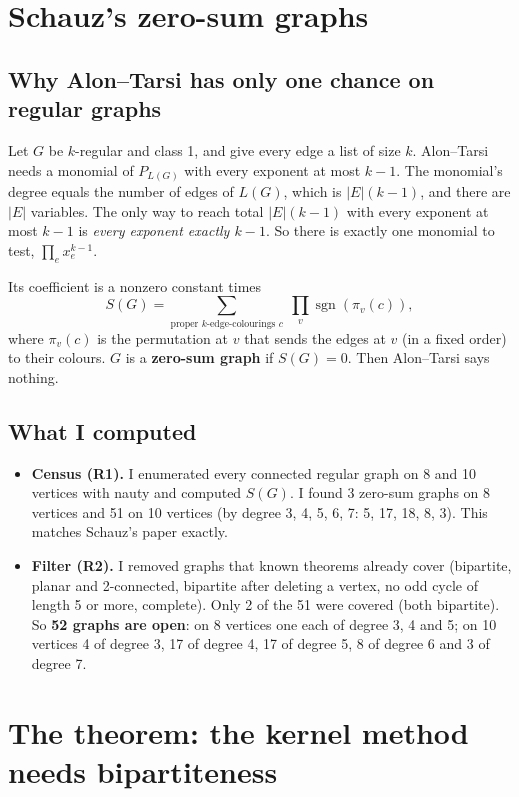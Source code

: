 \documentclass[11pt]{article}
\theoremstyle{plain}
\theoremstyle{definition}
\begin{document}
\section{Schauz's zero-sum graphs}

\subsection{Why Alon--Tarsi has only one chance on regular graphs}

Let $G$ be $k$-regular and class 1, and give every edge a list of size $k$. Alon--Tarsi needs a
monomial of $P_{L(G)}$ with every exponent at most $k-1$. The monomial's degree equals the
number of edges of $L(G)$, which is $|E|(k-1)$, and there are $|E|$ variables. The only way to
reach total $|E|(k-1)$ with every exponent at most $k-1$ is \emph{every exponent exactly $k-1$}.
So there is exactly one monomial to test, $\prod_e x_e^{k-1}$.

Its coefficient is a nonzero constant times
\[
  S(G) = \sum_{\text{proper } k\text{-edge-colourings } c} \; \prod_{v} \operatorname{sgn}(\pi_v(c)),
\]
where $\pi_v(c)$ is the permutation at $v$ that sends the edges at $v$ (in a fixed order) to
their colours. $G$ is a \textbf{zero-sum graph} if $S(G) = 0$. Then Alon--Tarsi says nothing.

\subsection{What I computed}

\begin{itemize}[leftmargin=*]
  \item \textbf{Census (R1).} I enumerated every connected regular graph on 8 and 10 vertices
        with nauty and computed $S(G)$. I found 3 zero-sum graphs on 8 vertices and 51 on 10
        vertices (by degree 3, 4, 5, 6, 7: 5, 17, 18, 8, 3). This matches Schauz's paper
        exactly.
  \item \textbf{Filter (R2).} I removed graphs that known theorems already cover (bipartite,
        planar and 2-connected, bipartite after deleting a vertex, no odd cycle of length 5 or
        more, complete). Only 2 of the 51 were covered (both bipartite). So \textbf{52 graphs are
        open}: on 8 vertices one each of degree 3, 4 and 5; on 10 vertices 4 of degree 3, 17 of
        degree 4, 17 of degree 5, 8 of degree 6 and 3 of degree 7.
\end{itemize}

\section{The theorem: the kernel method needs bipartiteness}
\end{document}
